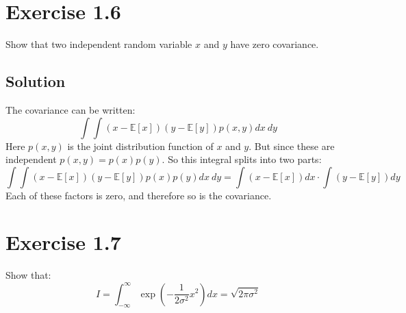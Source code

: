 \documentclass[12pt, a4paper]{article}
\numberwithin{equation}{section}
\begin{document}
\section{Exercise 1.6}
Show that two independent random variable $x$ and $y$ have zero covariance.

\subsection{Solution}
The covariance can be written:
\begin{equation}
\int\int(x-\mathbb{E}[x])(y-\mathbb{E}[y])p(x,y)dx\ dy
\end{equation}
Here $p(x,y)$ is the joint distribution function of $x$ and $y$. But since these are independent $p(x,y)=p(x)p(y)$. So this integral splits into two parts:
\begin{equation}
\int\int(x-\mathbb{E}[x])(y-\mathbb{E}[y])p(x)p(y)dx\ dy=\int(x-\mathbb{E}[x])dx\cdot\int(y-\mathbb{E}[y])dy
\end{equation}
Each of these factors is zero, and therefore so is the covariance.

\section{Exercise 1.7}
Show that:
\begin{equation}
I=\int_{-\infty}^\infty\exp\left(-\frac{1}{2\sigma^2}x^2\right)dx=\sqrt{2\pi\sigma^2}
\end{equation}
\end{document}
